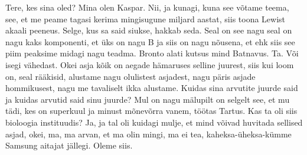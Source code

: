 
Tere, kes sina oled? Mina olen Kaspar. Nii, ja kunagi, kuna see võtame teema, see, et me peame tagasi kerima mingisugune miljard aastat, siis toona Lewist akaali peeneus. Selge, kus sa said siukse, hakkab seda.
Seal on see nagu seal on nagu kaks komponenti, et üks on nagu B ja siis on nagu nõusena, et ehk siis see piim peaksime midagi nagu teadma. Bronto alati kutsus mind Batnavus.
Ta. Või isegi vähedast.
Okei asja kõik on aegade hämaruses selline juurest, siis kui loom on, seal rääkisid, alustame nagu olulistest asjadest, nagu päris asjade hommikusest, nagu me tavaliselt ikka alustame. Kuidas sina arvutite juurde said ja kuidas arvutid said sinu juurde? Mul on nagu mälupilt on selgelt see, et mu tädi, kes on superkuul ja minust mõnevõrra vanem, töötas Tartus.
Kas ta oli siis bioloogia instituudis? Ja, ja tal oli kuidagi mulje, et mind võivad huvitada sellised asjad, okei, ma, ma arvan, et ma olin mingi, ma ei tea, kaheksa-üheksa-kümme Samsung aitajat jällegi.
Oleme siis.
